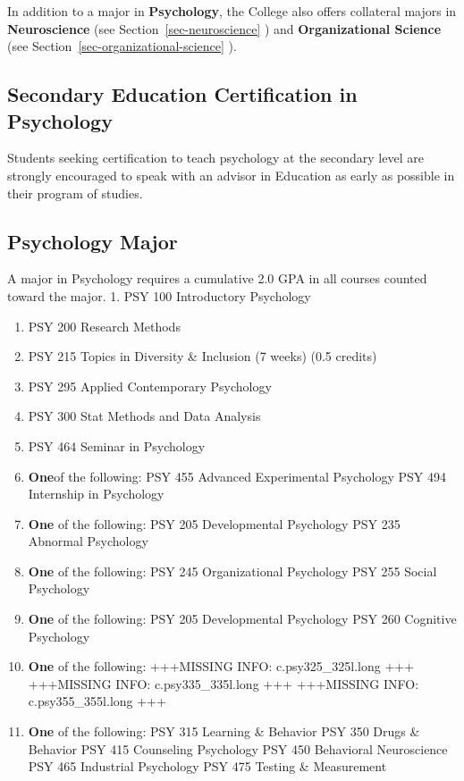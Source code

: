 \documentclass[
  letterpaper,
]{scrbook}
\begin{document}
In addition to a major in \textbf{Psychology}, the College also offers
collateral majors in \textbf{Neuroscience} (see
Section~\ref{sec-neuroscience} ) and \textbf{Organizational Science}
(see Section~\ref{sec-organizational-science} ).

\hypertarget{secondary-education-certification-in-psychology}{%
\subsection{Secondary Education Certification in
Psychology}\label{secondary-education-certification-in-psychology}}

Students seeking certification to teach psychology at the secondary
level are strongly encouraged to speak with an advisor in Education as
early as possible in their program of studies.

\hypertarget{psychology-major}{%
\subsection{Psychology Major}\label{psychology-major}}

A major in Psychology requires a cumulative 2.0 GPA in all courses
counted toward the major. 1. PSY 100 Introductory Psychology

\begin{enumerate}
\def\labelenumi{\arabic{enumi}.}
\setcounter{enumi}{1}
\item
  PSY 200 Research Methods
\item
  PSY 215 Topics in Diversity \& Inclusion (7 weeks) (0.5 credits)
\item
  PSY 295 Applied Contemporary Psychology
\item
  PSY 300 Stat Methods and Data Analysis
\item
  PSY 464 Seminar in Psychology
\item
  \textbf{One}of the following: PSY 455 Advanced Experimental Psychology
  PSY 494 Internship in Psychology
\item
  \textbf{One} of the following: PSY 205 Developmental Psychology PSY
  235 Abnormal Psychology
\item
  \textbf{One} of the following: PSY 245 Organizational Psychology PSY
  255 Social Psychology
\item
  \textbf{One} of the following: PSY 205 Developmental Psychology PSY
  260 Cognitive Psychology
\item
  \textbf{One} of the following: +++MISSING INFO: c.psy325\_325l.long
  +++ +++MISSING INFO: c.psy335\_335l.long +++ +++MISSING INFO:
  c.psy355\_355l.long +++
\item
  \textbf{One} of the following: PSY 315 Learning \& Behavior PSY 350
  Drugs \& Behavior PSY 415 Counseling Psychology PSY 450 Behavioral
  Neuroscience PSY 465 Industrial Psychology PSY 475 Testing \&
  Measurement
\end{enumerate}
\end{document}
